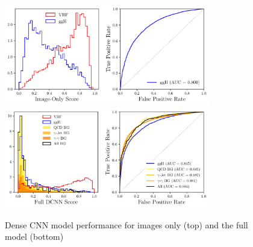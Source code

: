 %
\begin{figure}[h!]
    \includegraphics[width=0.8\textwidth]{figures/event_selection/imgonly_DCNN_LPS.pdf}
    \includegraphics[width=0.8\textwidth]{figures/event_selection/full_DCNN_LPS.pdf}
    \caption{Dense CNN model performance for images only (top) and the full model (bottom)}
    \label{fig:vbf_lps_appendix:image_only_DCNN}
\end{figure}
%
